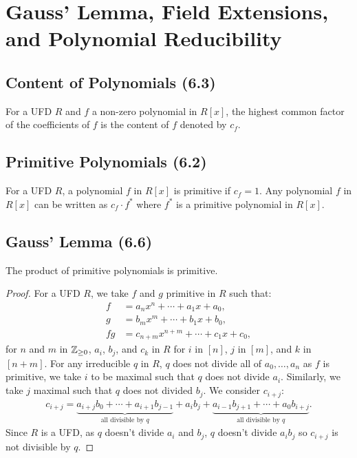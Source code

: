 \section{Gauss' Lemma, Field Extensions, and Polynomial Reducibility}

\subsection{Content of Polynomials (6.3)} \label{6.3}

For a UFD $R$ and $f$ a non-zero polynomial in $R[x]$, the highest common factor of
the coefficients of $f$ is the content of $f$ denoted by $c_f$.

\subsection{Primitive Polynomials (6.2)} \label{6.2}

For a UFD $R$, a polynomial $f$ in $R[x]$ is primitive if $c_f = 1$.
Any polynomial $f$ in $R[x]$ can be written as $c_f \cdot f^\ast$
where $f^\ast$ is a primitive polynomial in $R[x]$.

\subsection{Gauss' Lemma (6.6)} \label{6.6}

The product of primitive polynomials is primitive.

\begin{proof}
    For a UFD $R$, we take $f$ and $g$ primitive in $R$ such that: \begin{align*}
        f &= a_nx^n + \cdots + a_1x + a_0, \\
        g &= b_mx^m + \cdots + b_1x + b_0, \\
        fg &= c_{n + m}x^{n + m} + \cdots + c_1x + c_0,
    \end{align*} for $n$ and $m$ in $\mathbb{Z}_{\geq 0}$, $a_i$, $b_j$, and $c_k$ in
    $R$ for $i$ in $[n]$, $j$ in $[m]$, and $k$ in $[n + m]$. For any irreducible $q$
    in $R$, $q$ does not divide all of $a_0, \ldots, a_n$ as $f$ is primitive, we take
    $i$ to be maximal such that $q$ does not divide $a_i$. Similarly, we take $j$
    maximal such that $q$ does not divided $b_j$. We consider $c_{i + j}$: \begin{align*}
        c_{i + j} = 
        \underbrace{a_{i + j}b_0 + \cdots + a_{i + 1}b_{j - 1}}_{\text{all divisible by } q}
        + a_ib_j
        + \underbrace{a_{i - 1}b_{j + 1} + \cdots + a_0b_{i + j}}_{\text{all divisible by } q}.
    \end{align*} Since $R$ is a UFD, as $q$ doesn't divide $a_i$ and $b_j$, $q$ doesn't divide
    $a_ib_j$ so $c_{i + j}$ is not divisible by $q$.
\end{proof}

